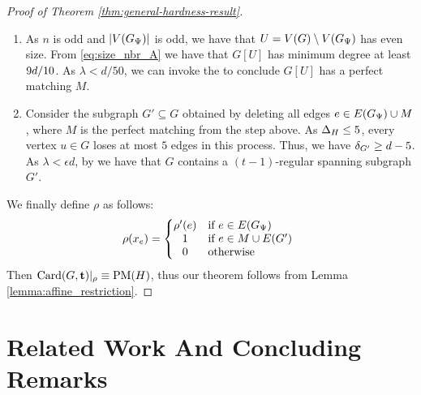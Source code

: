 \documentclass[11pt]{article}
\begin{document}
\begin{proof}[Proof of Theorem \ref{thm:general-hardness-result}]
\begin{enumerate}
\item{ As $n$ is odd and $|V(G_{\Psi})|$ is odd, we have that $U = V(G) \setminus V(G_{\Psi})$ has even size. From \eqref{eq:size_nbr_A} we have that $G[U]$ has minimum degree at least $9d/10$. As $\lambda < d/50$, we can invoke the  to conclude $G[U]$ has a perfect matching $M$. 
}
  
\item{
  Consider the subgraph $G' \subseteq G$ obtained by deleting all edges $e \in E(G_{\Psi}) \cup M$, where $M$ is the perfect matching from the step above. As $\Delta_{H} \leq 5$, every vertex $u \in G$ loses at most $5$ edges in this process. Thus, we have $\delta_{G'} \ge d - 5$. As $\lambda < \epsilon d$, by  we have that $G$ contains a $(t-1)$-regular spanning subgraph $G'$. }

\end{enumerate}

We finally define $\rho$ as follows:
\[
\rho(x_e) =
\left\{
\begin{array}{@{}cl}
\rho'(e) & \text{if } e \in \Edges{G_{\EmbeddingFunc}} \\
1 & \text{if } e \in M \cup E(G') \\
0 & \text{otherwise}
\end{array}
\right.
\]
Then $\text{Card}(G, \mathbf{t})|_\rho \equiv \text{PM}(H)$, thus our theorem follows from Lemma \ref{lemma:affine_restriction}.
\end{proof}


\section{Related Work And Concluding Remarks}
\label{sec:related-work}
\end{document}
